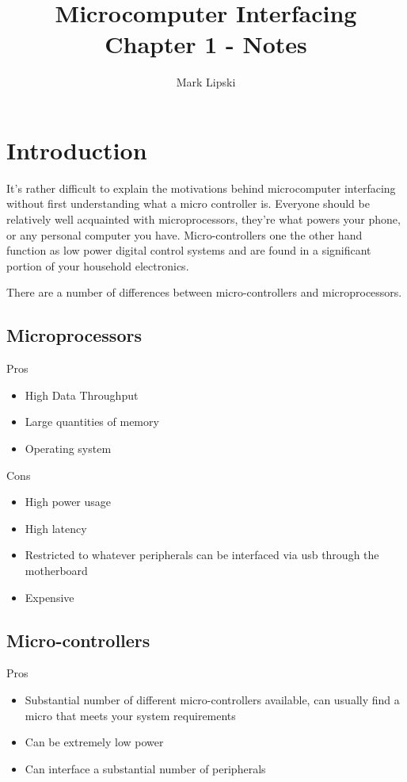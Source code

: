 \documentclass[10pt]{article}
\title{Microcomputer Interfacing Chapter 1 - Notes}
\author{Mark Lipski}
\begin{document}
\maketitle
\section{Introduction}
It's rather difficult to explain the motivations behind microcomputer interfacing without first understanding what a micro controller is. Everyone should be relatively well acquainted with microprocessors, they're what powers your phone, or any personal computer you have. Micro-controllers one the other hand function as low power digital control systems and are found in a significant portion of your household electronics.

There are a number of differences between micro-controllers and microprocessors.

\subsection{Microprocessors}
Pros
\begin{itemize}
\item High Data Throughput
\item Large quantities of memory
\item Operating system
\end{itemize}
	
Cons
\begin{itemize}
\item High power usage
\item High latency
\item Restricted to whatever peripherals can be interfaced via usb through the motherboard
\item Expensive
\end{itemize}
	
	
\subsection{Micro-controllers}
Pros
\begin{itemize}
\item Substantial number of different micro-controllers available, can usually find a micro that meets your system requirements
\item Can be extremely low power
\item Can interface a substantial number of peripherals
\end{itemize}
\end{document}
